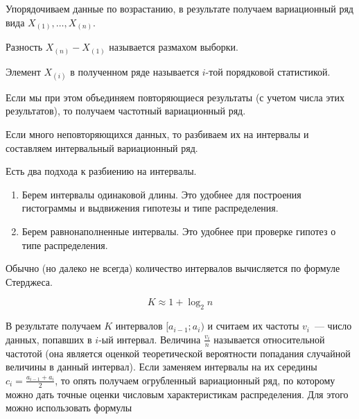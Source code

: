 

Упорядочиваем данные по возрастанию, в результате получаем вариационный ряд вида
\(X_{(1)}, \dotsc, X_{(n)}\).

\begin{definition}
  Разность \(X_{(n)} - X_{(1)}\) называется размахом выборки.
\end{definition}

\begin{definition}
  Элемент \(X_{(i)}\) в полученном ряде называется \(i\)-той порядковой
  статистикой.
\end{definition}

\begin{remark}
  Если мы при этом объединяем повторяющиеся результаты (с учетом числа этих
  результатов), то получаем частотный вариационный ряд.
\end{remark}


Если много неповторяющихся данных, то разбиваем их на интервалы и составляем
интервальный вариационный ряд.

\begin{remark}
  Есть два подхода к разбиению на интервалы.

  \begin{enumerate}
  \item
    Берем интервалы одинаковой длины. Это удобнее для построения гистограммы и
    выдвижения гипотезы и типе распределения.

  \item
    Берем равнонаполненные интервалы. Это удобнее при проверке гипотез о типе
    распределения.
  \end{enumerate}
\end{remark}

\begin{remark}
  Обычно (но далеко не всегда) количество интервалов вычисляется по формуле
  Стерджеса.

  \begin{equation*}
    K \approx 1 + \log_2 n
  \end{equation*}
\end{remark}

В результате получаем \(K\) интервалов \([a_{i - 1}; a_i)\) и считаем их
частоты \(v_i\)~--- число данных, попавших в \(i\)-ый интервал. Величина
\(\frac{v_i}{n}\) называется относительной частотой (она является оценкой
теоретической вероятности попадания случайной величины в данный интервал). Если
заменяем интервалы на их середины \(c_i = \frac{a_{i - 1} + a_i}{2}\), то опять
получаем огрубленный вариационный ряд, по которому можно дать точные оценки
числовым характеристикам распределения. Для этого можно использовать формулы

